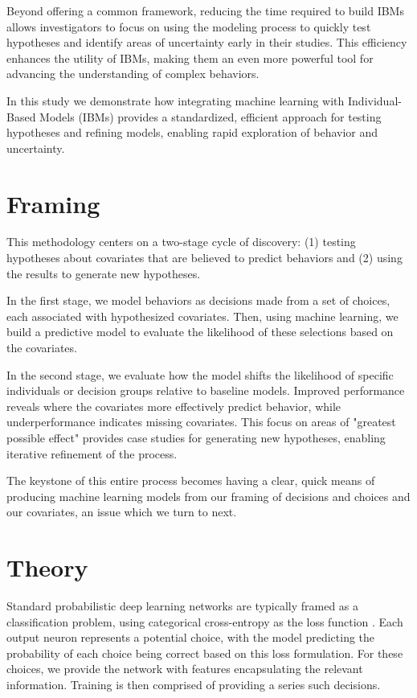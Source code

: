 \documentclass[11pt]{article}
\begin{document}
Beyond offering a common framework, reducing the time required to build IBMs allows investigators to focus on using the modeling process to quickly test hypotheses and identify areas of uncertainty early in their studies. This efficiency enhances the utility of IBMs, making them an even more powerful tool for advancing the understanding of complex behaviors.

In this study we demonstrate how integrating machine learning with Individual-Based Models (IBMs) provides a standardized, efficient approach for testing hypotheses and refining models, enabling rapid exploration of behavior and uncertainty.

\section*{Framing}

This methodology centers on a two-stage cycle of discovery: (1) testing hypotheses about covariates that are believed to predict behaviors and (2) using the results to generate new hypotheses.

In the first stage, we model behaviors as decisions made from a set of choices, each associated with hypothesized covariates. Then, using machine learning, we build a predictive model to evaluate the likelihood of these selections based on the covariates.

In the second stage, we evaluate how the model shifts the likelihood of specific individuals or decision groups relative to baseline models. Improved performance reveals where the covariates more effectively predict behavior, while underperformance indicates missing covariates. This focus on areas of "greatest possible effect" provides case studies for generating new hypotheses, enabling iterative refinement of the process.

The keystone of this entire process becomes having a clear, quick means of producing machine learning models from our framing of decisions and choices and our covariates, an issue which we turn to next. 

\section*{Theory}

Standard probabilistic deep learning networks are typically framed as a classification problem, using categorical cross-entropy as the loss function \citep{durr}. Each output neuron represents a potential choice, with the model predicting the probability of each choice being correct based on this loss formulation. For these choices, we provide the network with features encapsulating the relevant information. Training is then comprised of providing a series such decisions. 
\end{document}
